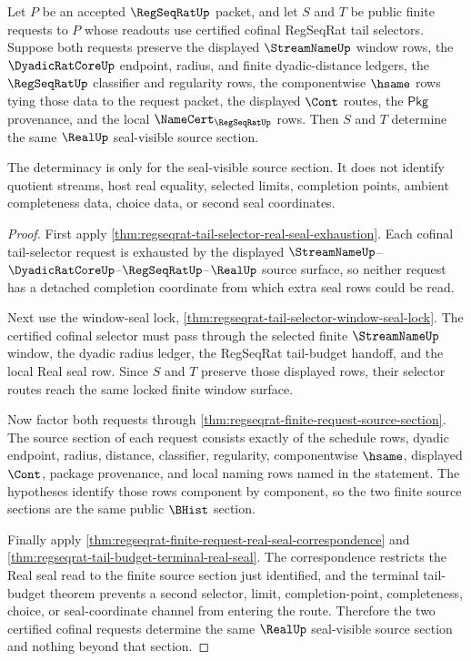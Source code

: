 \begin{theorem}
\label{thm:regseqrat-tail-selector-cofinal-request-determinacy}
Let $P$ be an accepted $\RegSeqRatUp$ packet, and let $S$ and $T$ be public
finite requests to $P$ whose readouts use certified cofinal RegSeqRat tail
selectors. Suppose both requests preserve the displayed $\StreamNameUp$ window
rows, the $\DyadicRatCoreUp$ endpoint, radius, and finite dyadic-distance
ledgers, the $\RegSeqRatUp$ classifier and regularity rows, the componentwise
$\hsame$ rows tying those data to the request packet, the displayed $\Cont$
routes, the $\mathsf{Pkg}$ provenance, and the local $\NameCert_{\RegSeqRatUp}$
rows. Then $S$ and $T$ determine the same $\RealUp$ seal-visible source
section.

The determinacy is only for the seal-visible source section. It does not
identify quotient streams, host real equality, selected limits, completion
points, ambient completeness data, choice data, or second seal coordinates.
\end{theorem}
\begin{proof}
First apply \autoref{thm:regseqrat-tail-selector-real-seal-exhaustion}. Each
cofinal tail-selector request is exhausted by the displayed
$\StreamNameUp$--$\DyadicRatCoreUp$--$\RegSeqRatUp$--$\RealUp$ source surface,
so neither request has a detached completion coordinate from which extra seal
rows could be read.

Next use the window-seal lock,
\autoref{thm:regseqrat-tail-selector-window-seal-lock}. The certified cofinal
selector must pass through the selected finite $\StreamNameUp$ window, the
dyadic radius ledger, the RegSeqRat tail-budget handoff, and the local Real
seal row. Since $S$ and $T$ preserve those displayed rows, their selector
routes reach the same locked finite window surface.

Now factor both requests through
\autoref{thm:regseqrat-finite-request-source-section}. The source section of
each request consists exactly of the schedule rows, dyadic endpoint, radius,
distance, classifier, regularity, componentwise $\hsame$, displayed $\Cont$,
package provenance, and local naming rows named in the statement. The
hypotheses identify those rows component by component, so the two finite
source sections are the same public $\BHist$ section.

Finally apply
\autoref{thm:regseqrat-finite-request-real-seal-correspondence} and
\autoref{thm:regseqrat-tail-budget-terminal-real-seal}. The correspondence
restricts the Real seal read to the finite source section just identified, and
the terminal tail-budget theorem prevents a second selector, limit,
completion-point, completeness, choice, or seal-coordinate channel from
entering the route. Therefore the two certified cofinal requests determine the
same $\RealUp$ seal-visible source section and nothing beyond that section.
\end{proof}

